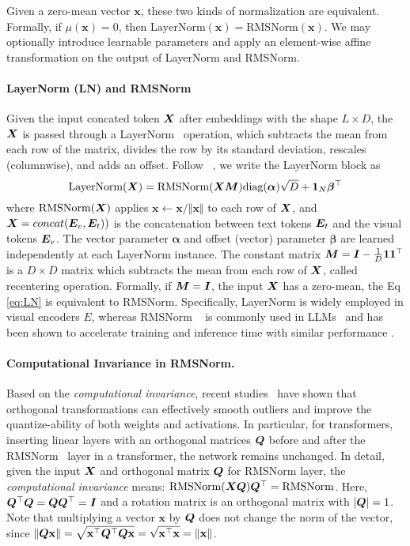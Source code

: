 Given a zero-mean vector $\mathbf{x}$, these two kinds of normalization are equivalent.
Formally, if $\mu(\mathbf{x}) = 0$, then $\text{LayerNorm}(\mathbf{x}) = \text{RMSNorm}(\mathbf{x})$.
We may optionally introduce learnable parameters and apply an element-wise affine transformation on the output of LayerNorm and RMSNorm.

\paragraph{LayerNorm (LN) and RMSNorm} Given the input concated token $\boldsymbol{X}$ after embeddings with the shape $L\times D$, the $\boldsymbol{X}$ is passed through a LayerNorm~\citep{layernorm} operation, which subtracts the mean from each row of the matrix, divides the row by its standard deviation, rescales (columnwise), and adds an offset. Follow ~\citep{ashkboos2024slicegpt}, we write the LayerNorm block as
\begin{equation}
\textrm{LayerNorm}(\boldsymbol{X}) = \textrm{RMSNorm}(\boldsymbol{X} \boldsymbol{M})\textrm{diag}(\boldsymbol\alpha)\sqrt{D} + \mathbf{1}_N\boldsymbol\beta^\top
\label{eq:LN}
\end{equation}
where $\textrm{RMSNorm}(\boldsymbol{X})$ applies $\mathbf{x}\leftarrow\mathbf{x}/\Vert\mathbf{x}\Vert$ to each row of $\boldsymbol{X}$, and $\boldsymbol{X} = concat(\boldsymbol{E}_v,\boldsymbol{E}_t))$ is the concatenation between text tokens $\boldsymbol{E}_t$ and the visual tokens $\boldsymbol{E}_v$.
The vector parameter $\boldsymbol\alpha$ and offset (vector) parameter $\boldsymbol\beta$ are learned independently at each LayerNorm instance. The constant matrix $\boldsymbol{M}=\boldsymbol{I} - \frac{1}{D}\mathbf{1}\mathbf{1}^\top$ is a $D\times D$ matrix which subtracts the mean from each row of $\boldsymbol{X}$, called recentering operation. Formally, if $\boldsymbol{M}=\boldsymbol{I}$, the input $\boldsymbol{X}$ has a zero-mean, the Eq \ref{eq:LN} is equivalent to RMSNorm. Specifically, LayerNorm is widely employed in visual encoders $E$, whereas RMSNorm ~\citep{RMSNorm} is commonly used in LLMs~\citep{touvron2023llama, llama3} and has been shown to accelerate training and inference time with similar performance \citep{RMSNorm}.

\paragraph{Computational Invariance in RMSNorm.} 
Based on the \emph{computational invariance}, recent studies~\citep{ashkboos2024slicegpt, ashkboos2024quarot} have shown that orthogonal transformations can effectively smooth outliers and improve the quantize-ability of both weights and activations. In particular, for transformers, inserting linear layers with an orthogonal matrices $\boldsymbol{Q}$ before and after the RMSNorm~\citep{RMSNorm} layer in a transformer, the network remains unchanged. In detail, given the input $\boldsymbol{X}$ and orthogonal matrix $\boldsymbol{Q}$ for RMSNorm layer, the \emph{computational invariance} means: $\textrm{RMSNorm}(\boldsymbol{X} \boldsymbol{Q})\boldsymbol{Q}^\top = \textrm{RMSNorm}$. Here, $\boldsymbol{Q}^\top\boldsymbol{Q} = \boldsymbol{Q}\boldsymbol{Q}^\top = \boldsymbol{I}$ and a rotation matrix is an orthogonal matrix with $|\boldsymbol{Q}| = 1$. Note that multiplying a vector $\mathbf{x}$ by $\boldsymbol{Q}$ does not change the norm of the vector, since $\Vert\boldsymbol{Q}\mathbf{x}\Vert = \sqrt{\mathbf{x}^\top\boldsymbol{Q}^\top \boldsymbol{Q}\mathbf{x}} = \sqrt{\mathbf{x}^\top\mathbf{x}} = \Vert\mathbf{x}\Vert$.

